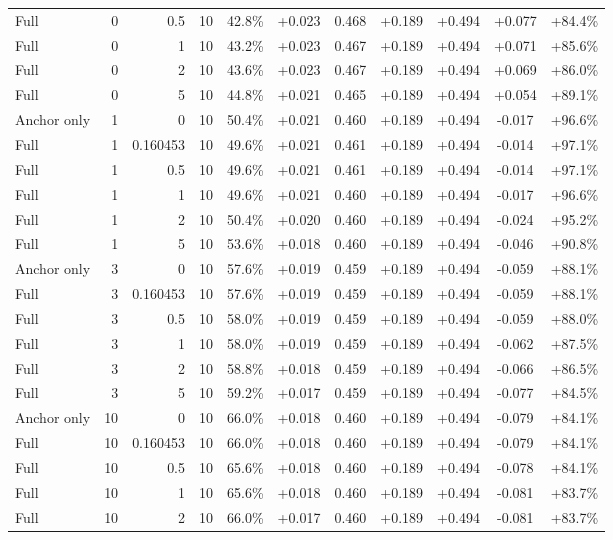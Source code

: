 \begin{table}[htbp]
\begin{tabular}{lrrrccccccc}
Full & 0 & 0.5 & 10 & 42.8\% & +0.023 & 0.468 & +0.189 & +0.494 & +0.077 & +84.4\% \\
Full & 0 & 1 & 10 & 43.2\% & +0.023 & 0.467 & +0.189 & +0.494 & +0.071 & +85.6\% \\
Full & 0 & 2 & 10 & 43.6\% & +0.023 & 0.467 & +0.189 & +0.494 & +0.069 & +86.0\% \\
Full & 0 & 5 & 10 & 44.8\% & +0.021 & 0.465 & +0.189 & +0.494 & +0.054 & +89.1\% \\
Anchor only & 1 & 0 & 10 & 50.4\% & +0.021 & 0.460 & +0.189 & +0.494 & -0.017 & +96.6\% \\
Full & 1 & 0.160453 & 10 & 49.6\% & +0.021 & 0.461 & +0.189 & +0.494 & -0.014 & +97.1\% \\
Full & 1 & 0.5 & 10 & 49.6\% & +0.021 & 0.461 & +0.189 & +0.494 & -0.014 & +97.1\% \\
Full & 1 & 1 & 10 & 49.6\% & +0.021 & 0.460 & +0.189 & +0.494 & -0.017 & +96.6\% \\
Full & 1 & 2 & 10 & 50.4\% & +0.020 & 0.460 & +0.189 & +0.494 & -0.024 & +95.2\% \\
Full & 1 & 5 & 10 & 53.6\% & +0.018 & 0.460 & +0.189 & +0.494 & -0.046 & +90.8\% \\
Anchor only & 3 & 0 & 10 & 57.6\% & +0.019 & 0.459 & +0.189 & +0.494 & -0.059 & +88.1\% \\
Full & 3 & 0.160453 & 10 & 57.6\% & +0.019 & 0.459 & +0.189 & +0.494 & -0.059 & +88.1\% \\
Full & 3 & 0.5 & 10 & 58.0\% & +0.019 & 0.459 & +0.189 & +0.494 & -0.059 & +88.0\% \\
Full & 3 & 1 & 10 & 58.0\% & +0.019 & 0.459 & +0.189 & +0.494 & -0.062 & +87.5\% \\
Full & 3 & 2 & 10 & 58.8\% & +0.018 & 0.459 & +0.189 & +0.494 & -0.066 & +86.5\% \\
Full & 3 & 5 & 10 & 59.2\% & +0.017 & 0.459 & +0.189 & +0.494 & -0.077 & +84.5\% \\
Anchor only & 10 & 0 & 10 & 66.0\% & +0.018 & 0.460 & +0.189 & +0.494 & -0.079 & +84.1\% \\
Full & 10 & 0.160453 & 10 & 66.0\% & +0.018 & 0.460 & +0.189 & +0.494 & -0.079 & +84.1\% \\
Full & 10 & 0.5 & 10 & 65.6\% & +0.018 & 0.460 & +0.189 & +0.494 & -0.078 & +84.1\% \\
Full & 10 & 1 & 10 & 65.6\% & +0.018 & 0.460 & +0.189 & +0.494 & -0.081 & +83.7\% \\
Full & 10 & 2 & 10 & 66.0\% & +0.017 & 0.460 & +0.189 & +0.494 & -0.081 & +83.7\% \\

\end{tabular}
\end{table}
